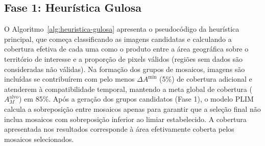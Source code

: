 \documentclass[a4paper,11pt]{article}
\begin{document}
\subsection{Fase 1: Heurística Gulosa}\label{sec:fase1}
\vspace{-4mm}
O Algoritmo~\ref{alg:heuristica-gulosa} apresenta o pseudocódigo da heurística principal, que começa classificando as imagens candidatas e calculando a cobertura efetiva de cada uma como o produto entre a área geográfica sobre o território de interesse e a proporção de pixels válidos (regiões sem dados são consideradas não válidas). Na formação dos grupos de mosaicos, imagens são incluídas se contribuírem com pelo menos $\Delta A^{\min}$ (5\%) de cobertura adicional e atenderem à compatibilidade temporal, mantendo a meta global de cobertura ($A_M^{\text{alvo}}$) em 85\%. Após a geração dos grupos candidatos (Fase 1), o modelo PLIM calcula a sobreposição entre mosaicos apenas para garantir que a seleção final não inclua mosaicos com sobreposição inferior ao limiar estabelecido. A cobertura apresentada nos resultados corresponde à área efetivamente coberta pelos mosaicos selecionados.
\vspace{-3mm}
\algnewcommand{}
\algnewcommand{}
\end{document}
